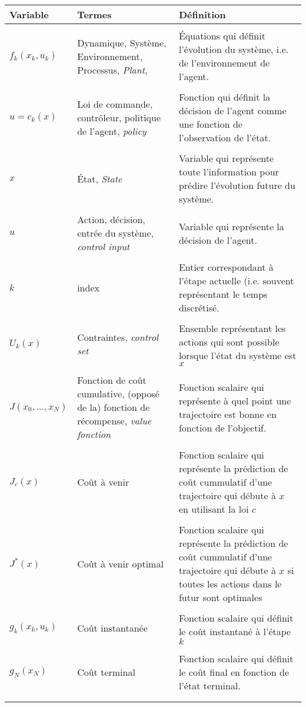 \begin{center}
\begin{tabular}{  p{3.0cm} p{6.0cm} p{7.0cm} }
\hline 
\textbf{Variable} & \textbf{Termes} & \textbf{Définition} \\ \hline\hline \\
$f_k(x_k,u_k)$ & Dynamique, Système, Environnement, Processus, \textit{Plant}, &
Équations qui définit l'évolution du système, i.e. de l'environnement de l'agent.
\\  &  \\ 
$u=c_k(x)$ & Loi de commande, contrôleur, politique de l'agent, \textit{policy} &
Fonction qui définit la décision de l'agent comme une fonction de l'observation de l'état.
\\  &  \\ 
$x$ & État, \textit{State} &
Variable qui représente toute l'information pour prédire l'évolution future du système.
\\  &  \\ 
$u$ & Action, décision, entrée du système, \textit{control input} &
Variable qui représente la décision de l'agent.
\\  &  \\ 
$k$ & index &
Entier correspondant à l'étape actuelle (i.e. souvent représentant le temps discrétisé. 
\\  &  \\ 
$U_k(x)$ & Contraintes, \textit{control set} &
Ensemble représentant les actions qui sont possible lorsque l'état du système est $x$
\\  &  \\ 
$J(x_0, ... , x_N)$ & Fonction de coût cumulative, (opposé de la) fonction de récompense, \textit{value fonction} &
Fonction scalaire qui représente à quel point une trajectoire est bonne en fonction de l'objectif.
\\  &  \\ 
$J_c(x)$ & Coût à venir &
Fonction scalaire qui représente la prédiction de coût cummulatif d'une trajectoire qui débute à $x$ en utilisant la loi $c$
\\  &  \\ 
$J^*(x)$ & Coût à venir optimal &
Fonction scalaire qui représente la prédiction de coût cummulatif d'une trajectoire qui débute à $x$ si toutes les actions dans le futur sont optimales
\\  &  \\
$g_k(x_k,u_k)$ & Coût instantanée & Fonction scalaire qui définit le coût instantané à l'étape $k$
\\  &  \\ 
$g_N(x_N)$ & Coût terminal &
Fonction scalaire qui définit le coût final en fonction de l'état terminal.
\\  &  \\ 
\hline
\label{tab}
\end{tabular}
\end{center}




